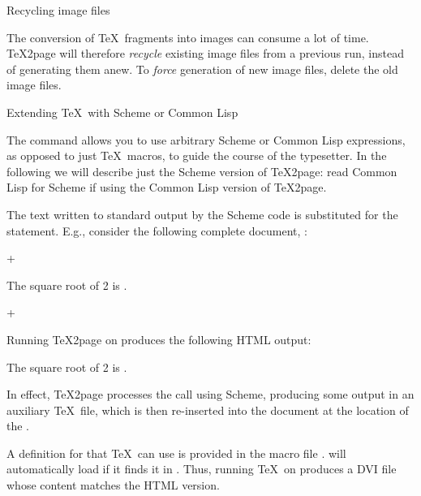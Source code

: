 {{{{{{{{{{{{{{\p{
\ifx\shipout\UnDeFiNeD %
  \imgdef\ohm{$\Omega$}
\else
  \def\ohm{$\Omega$}
\fi
}

\beginsection Recycling image files

%
The conversion of \TeX\ fragments into images can
consume a lot of time.  \TeX2page will therefore
{\em recycle} existing image files from
a previous run, instead of generating them anew.
To {\em force} generation of new image files, delete
the old image files.

 Extending \TeX\ with Scheme or Common Lisp

%
The command \p{\eval} allows you to use arbitrary
Scheme or Common Lisp expressions, as opposed to just \TeX\ macros, to
guide the course of the typesetter.  In the following we will describe
just
the Scheme version of \TeX2page: read Common Lisp for Scheme if
using the Common Lisp version of \TeX2page.

The text written
to standard output by the Scheme code is substituted
for the \p{\eval} statement.  E.g., consider the
following complete document, :

\p+


The square root of 2 is
.

\bye
+

\n Running \TeX2page on  produces
the following HTML output:

\quote
\n The square root of 2 is
.
\endquote

\n In effect, \TeX2page processes the \p{\eval} call
using Scheme, producing some output in an auxiliary
\TeX\ file, which is then re-inserted into the document at the location of
the \p{\eval}.

A definition for \p{\eval} that \TeX\ can use
is provided in the macro file .
 will automatically load  if it finds it in
.
Thus, running \TeX\ on
 produces a DVI file whose
content matches the HTML version.


}}}}}}}}}}}}}}
